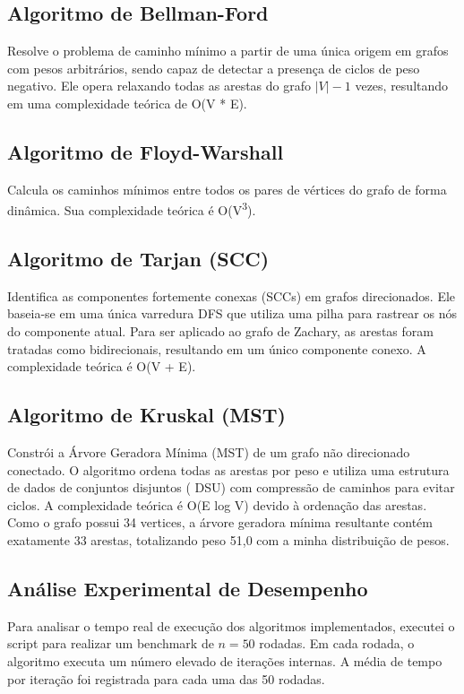 \documentclass[sigconf]{webmedia}
\begin{document}
\subsection{Algoritmo de Bellman-Ford}
Resolve o problema de caminho mínimo a partir de uma única origem em grafos com pesos arbitrários, sendo capaz de detectar a presença de ciclos de peso negativo. Ele opera relaxando todas as arestas do grafo $|V| - 1$ vezes, resultando em uma complexidade teórica de O(V * E).

\subsection{Algoritmo de Floyd-Warshall}
Calcula os caminhos mínimos entre todos os pares de vértices do grafo de forma dinâmica. Sua complexidade teórica é O(V\textsuperscript{3}).

\subsection{Algoritmo de Tarjan (SCC)}
Identifica as componentes fortemente conexas (SCCs) em grafos direcionados. Ele baseia-se em uma única varredura DFS que utiliza uma pilha para rastrear os nós do componente atual. Para ser aplicado ao grafo de Zachary, as arestas foram tratadas como bidirecionais, resultando em um único componente conexo. A complexidade teórica é O(V + E).

\subsection{Algoritmo de Kruskal (MST)}
Constrói a Árvore Geradora Mínima (MST) de um grafo não direcionado conectado. O algoritmo ordena todas as arestas por peso e utiliza uma estrutura de dados de conjuntos disjuntos ( {DSU}) com compressão de caminhos para evitar ciclos. A complexidade teórica é O(E log V) devido à ordenação das arestas.
Como o grafo possui 34 vertices, a árvore geradora mínima resultante contém exatamente 33 arestas, totalizando peso 51,0 com a minha distribuição de pesos.

\subsection{Análise Experimental de Desempenho}

Para analisar o tempo real de execução dos algoritmos implementados, executei o script  para realizar um benchmark de $n = 50$ rodadas. Em cada rodada, o algoritmo executa um número elevado de iterações internas. A média de tempo por iteração foi registrada para cada uma das 50 rodadas.
\end{document}
